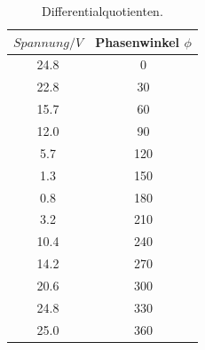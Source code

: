 \begin{table}
  \centering
  \begin{tabular}{c c}
    \toprule
    $Spannung/V$  &  Phasenwinkel $\phi$\\
    \midrule
    24.8  &    0  \\
    22.8  &   30  \\
    15.7  &   60  \\
    12.0  &   90  \\
     5.7  &  120  \\
     1.3  &  150  \\
     0.8  &  180  \\
     3.2  &  210  \\
    10.4  &  240  \\
    14.2  &  270  \\
    20.6  &  300  \\
    24.8  &  330  \\
    25.0  &  360  \\
   \bottomrule
 \end{tabular}
 \caption{Differentialquotienten.}
 \label{tab:Diffquo}
\end{table}

